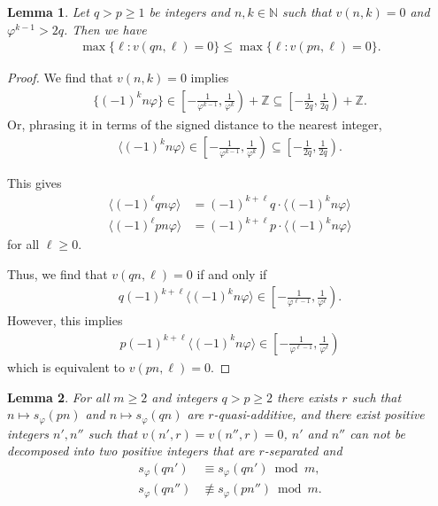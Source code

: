 \documentclass[12pt]{amsart}
\newtheorem{lemma}{Lemma}
\begin{document}
\begin{lemma}\label{lem:multiplication_low_digits}
  Let $q>p \geq 1$ be integers and $n,k \in {\mathbb{N}}$ such that $v(n,k) = 0$ and $\varphi^{k-1} > 2 q$.
  Then we have
  \begin{align*}
    \max \{\ell : v(qn,\ell) = 0\} \leq \max \{\ell: v(pn,\ell) = 0\}.
  \end{align*}
\end{lemma}
\begin{proof}
  We find that $v(n,k) = 0$ implies 
  \begin{align*}
    \{(-1)^k n \varphi\} \in \left[-\frac{1}{\varphi^{k-1}},\frac{1}{\varphi^k}\right) + {\mathbb{Z}} \subseteq \left[-\frac{1}{2 q}, \frac{1}{2q}\right) + {\mathbb{Z}}.   
  \end{align*}
  Or, phrasing it in terms of the signed distance to the nearest integer,
  \begin{align*}
    \langle (-1)^k n \varphi\rangle \in \left[-\frac{1}{\varphi^{k-1}},\frac{1}{\varphi^k}\right) \subseteq \left[-\frac{1}{2 q}, \frac{1}{2q}\right).
  \end{align*}

  This gives
  \begin{align*}
    \langle (-1)^{\ell} q n \varphi\rangle &= (-1)^{k + \ell} q \cdot \langle(-1)^k n \varphi\rangle\\
    \langle (-1)^{\ell} p n \varphi\rangle &= (-1)^{k + \ell} p \cdot \langle(-1)^k n \varphi\rangle
  \end{align*}
  for all $\ell \geq 0$.

  
  Thus, we find that $v(qn,\ell) = 0$ if and only if
  \begin{align*}
    q (-1)^{k + \ell} \langle (-1)^k n \varphi\rangle \in \left[-\frac{1}{\varphi^{\ell-1}},\frac{1}{\varphi^{\ell}}\right).
  \end{align*}
  However, this implies
  \begin{align*}
    p (-1)^{k + \ell} \langle (-1)^k n \varphi\rangle \in \left[-\frac{1}{\varphi^{\ell-1}},\frac{1}{\varphi^{\ell}}\right)
  \end{align*}
  which is equivalent to $v(pn,\ell) = 0$.
\end{proof}

\begin{lemma}\label{LeX}
  For all $m \geq 2$ and integers  $q>p \geq 2$ there exists $r$ such that $n \mapsto s_{\varphi}(pn)$ and $n\mapsto s_{\varphi}(qn)$ are $r$-quasi-additive,
  and there exist positive integers $n',n''$ such that $v(n',r) = v(n'',r) = 0$,
  $n'$ and $n''$ can not be decomposed into two positive integers that are $r$-separated and
  \begin{align*}
    s_\varphi(qn')&\equiv s_\varphi(qn') \bmod m,\\
    s_\varphi(qn'') &\not \equiv s_\varphi(pn'') \bmod m.
  \end{align*}
\end{lemma}
\end{document}
